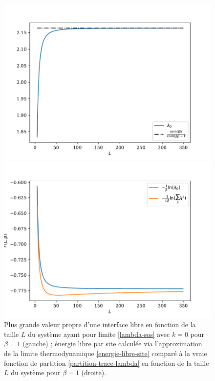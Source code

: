 \begin{figure}
	\begin{minipage}[t]{0.5\linewidth}
		\includegraphics[width=\linewidth]{isingtosos/freeene-lambda0-libre.pdf}
	\end{minipage}%
	\begin{minipage}[t]{0.5\linewidth}
		\includegraphics[width=\linewidth]{isingtosos/freeene-thermo-libre.pdf}
	\end{minipage}
	\caption{Plus grande valeur propre d'une interface libre en fonction de la taille $L$ du système  ayant pour limite \ref{lambda-sos} avec $k=0$ pour $\beta = 1$ (gauche)  ; énergie libre par site calculée via l'approximation de la limite thermodynamique \ref{energie-libre-site} comparé à la vraie fonction de partition \ref{partition-trace-lambda} en fonction de la taille $L$ du système pour $\beta = 1$ (droite).}
	\vspace{-0.5cm}
\end{figure}  


